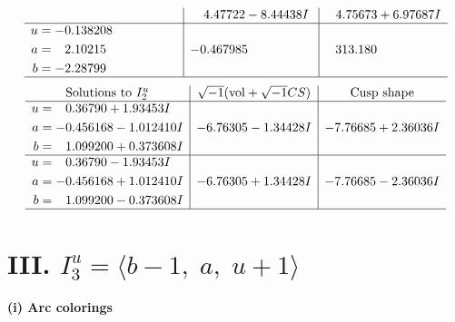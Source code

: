 \documentclass[1p]{elsarticle_modified}
\theoremstyle{definition}
\newcommand{\I}{\sqrt{-1}}
\begin{document}
$$\begin{array}{c|c|c}
 & \phantom{-}4.47722 - 8.44438 I & \phantom{-}4.75673 + 6.97687 I \\ \hline\begin{aligned}
u &= -0.138208\phantom{ +0.000000I} \\
a &= \phantom{-}2.10215\phantom{ +0.000000I} \\
b &= -2.28799\phantom{ +0.000000I}\end{aligned}
 & -0.467985\phantom{ +0.000000I} & \phantom{-}313.180\phantom{ +0.000000I}\\
 \hline 
 \end{array}$$\newpage$$\begin{array}{c|c|c}  
\text{Solutions to }I^u_{2}& \I (\text{vol} + \sqrt{-1}CS) & \text{Cusp shape}\\
 \hline 
\begin{aligned}
u &= \phantom{-}0.36790 + 1.93453 I \\
a &= -0.456168 - 1.012410 I \\
b &= \phantom{-}1.099200 + 0.373608 I\end{aligned}
 & -6.76305 - 1.34428 I & -7.76685 + 2.36036 I \\ \hline\begin{aligned}
u &= \phantom{-}0.36790 - 1.93453 I \\
a &= -0.456168 + 1.012410 I \\
b &= \phantom{-}1.099200 - 0.373608 I\end{aligned}
 & -6.76305 + 1.34428 I & -7.76685 - 2.36036 I\\
 \hline 
 \end{array}$$\newpage\newpage\renewcommand{\arraystretch}{1}
\centering \section*{III. $I^u_{3}= \langle b-1,\;a,\;u+1 \rangle$}
\flushleft \textbf{(i) Arc colorings}\\
\end{document}
